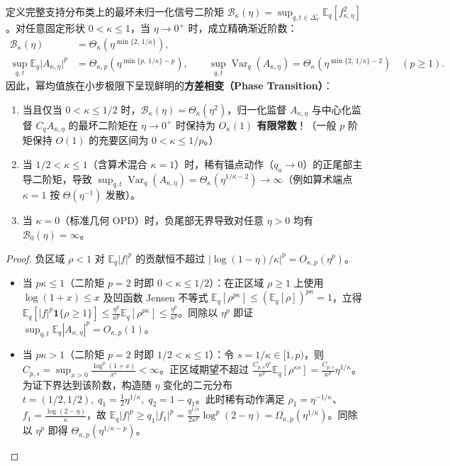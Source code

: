\documentclass[lang=cn,scheme=chinese,openany]{../book/elegantbook}
\newcommand{\E}{\mathbb E}
\newcommand{\Var}{\operatorname{Var}}
\begin{document}
\begin{theorem}
\label{thm:proximal-moment-threshold}
\label{thm:power-general-moment-threshold}
定义完整支持分布类上的最坏未归一化信号二阶矩 $\mathcal B_\kappa(\eta)=\sup_{q,t\in\Delta_V^\circ}\E_q[f_{\kappa,\eta}^2]$。对任意固定形状 $0<\kappa\le 1$，当 $\eta\to 0^+$ 时，成立精确渐近阶数：
\begin{align}
 \mathcal B_\kappa(\eta)&=\Theta_\kappa\!\left(\eta^{\min\{2,\,1/\kappa\}}\right),
 \label{eq:proximal-sharp-moment-order}\\
 \sup_{q,t}\E_q\bigl|A_{\kappa,\eta}\bigr|^p
 &=\Theta_{\kappa,p}\!\left(\eta^{\min\{p,\,1/\kappa\}-p}\right),
 \qquad
 \sup_{q,t}\Var_q(A_{\kappa,\eta})
 =\Theta_\kappa\!\left(\eta^{\min\{2,\,1/\kappa\}-2}\right)\quad(p\ge 1).
\end{align}
因此，幂均值族在小步极限下呈现鲜明的\textbf{方差相变（Phase Transition）}：
\begin{enumerate}
\item 当且仅当 \textbf{$0<\kappa\le 1/2$} 时，$\mathcal B_\kappa(\eta)=\Theta_\kappa(\eta^2)$，归一化监督 $A_{\kappa,\eta}$ 与中心化监督 $C_q A_{\kappa,\eta}$ 的最坏二阶矩在 $\eta\to 0^+$ 时保持为 \textbf{$O_\kappa(1)$ 有限常数}！（一般 $p$ 阶矩保持 $O(1)$ 的充要区间为 $0<\kappa\le 1/p$。）
\item 当 \textbf{$1/2<\kappa\le 1$}（含算术混合 $\kappa=1$）时，稀有锚点动作（$q_a\to 0$）的正尾部主导二阶矩，导致 $\sup_{q,t}\Var_q(A_{\kappa,\eta})=\Theta_\kappa(\eta^{1/\kappa-2})\to\infty$（例如算术端点 $\kappa=1$ 按 $\Theta(\eta^{-1})$ 发散）。
\item 当 \textbf{$\kappa=0$}（标准几何 OPD）时，负尾部无界导致对任意 $\eta>0$ 均有 $\mathcal B_0(\eta)=\infty$。
\end{enumerate}
\end{theorem}
\begin{proof}
负区域 $\rho<1$ 对 $\E_q|f|^p$ 的贡献恒不超过 $|\log(1-\eta)/\kappa|^p=O_{\kappa,p}(\eta^p)$。
\begin{itemize}
\item 当 $p\kappa\le 1$（二阶矩 $p=2$ 时即 $0<\kappa\le 1/2$）：在正区域 $\rho\ge 1$ 上使用 $\log(1+x)\le x$ 及凹函数 Jensen 不等式 $\E_q[\rho^{p\kappa}]\le(\E_q[\rho])^{p\kappa}=1$，立得 $\E_q[|f|^p\mathbf1\{\rho\ge 1\}]\le\frac{\eta^p}{\kappa^p}\E_q[\rho^{p\kappa}]\le\frac{\eta^p}{\kappa^p}$。同除以 $\eta^p$ 即证 $\sup_{q,t}\E_q|A_{\kappa,\eta}|^p=O_{\kappa,p}(1)$。
\item 当 $p\kappa>1$（二阶矩 $p=2$ 时即 $1/2<\kappa\le 1$）：令 $s=1/\kappa\in[1,p)$，则 $C_{p,s}=\sup_{x>0}\frac{\log^p(1+x)}{x^s}<\infty$。正区域期望不超过 $\frac{C_{p,s}\eta^s}{\kappa^p}\E_q[\rho^{\kappa s}]=\frac{C_{p,s}}{\kappa^p}\eta^{1/\kappa}$。为证下界达到该阶数，构造随 $\eta$ 变化的二元分布 $t=(1/2,1/2),\; q_1=\frac12\eta^{1/\kappa},\; q_2=1-q_1$。此时稀有动作满足 $\rho_1=\eta^{-1/\kappa}$、$f_1=\frac{\log(2-\eta)}{\kappa}$，故 $\E_q|f|^p\ge q_1|f_1|^p=\frac{\eta^{1/\kappa}}{2\kappa^p}\log^p(2-\eta)=\Omega_{\kappa,p}(\eta^{1/\kappa})$。同除以 $\eta^p$ 即得 $\Theta_{\kappa,p}(\eta^{1/\kappa-p})$。
\end{itemize}
\end{proof}
\end{document}
